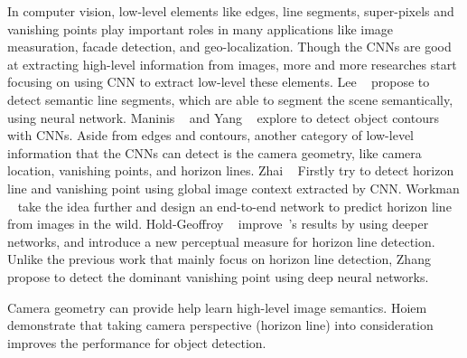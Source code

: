 
In computer vision, low-level elements like edges, line segments,
super-pixels and vanishing points play important roles in many
applications like image measuration, facade detection, and
geo-localization.
Though the CNNs are good at extracting high-level information from
images, more and more researches start focusing on using CNN to
extract low-level these elements.
%
Lee \etal~\cite{lee2017semantic} propose to detect semantic line
segments, which are able to segment the scene semantically, using
neural network. Maninis \etal~\cite{maninis2016convolutional} and Yang
\etal~\cite{yang2016object} explore to detect object contours with
CNNs.
%
Aside from edges and contours, another category of low-level
information that the CNNs can detect is the camera geometry, like
camera location, vanishing points, and horizon lines.
Zhai \etal~\cite{zhai2016horizon} Firstly try to detect horizon
line and vanishing point using global image context extracted by CNN.
Workman \etal~\cite{workman2016horizon} take the idea further and
design an end-to-end network to predict horizon line from images
in the wild. 
Hold-Geoffroy \etal~\cite{hold2017perceptual}
improve~\cite{workman2016horizon}'s results by using deeper networks,
and introduce a new perceptual measure for horizon line detection.
Unlike the previous work that mainly focus on horizon line detection,
Zhang \etal~\cite{zhang2018dominant} propose to detect the dominant
vanishing point using deep neural networks.

Camera geometry can provide help learn high-level image semantics.
Hoiem \etal~\cite{hoiem2008putting} demonstrate that taking camera
perspective (horizon line) into consideration improves the performance
for object detection.


